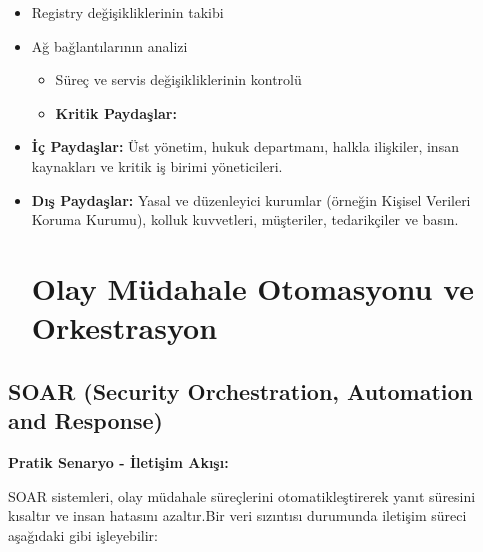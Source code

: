 \begin{itemize}
\begin{itemize}
        \item Registry değişikliklerinin takibi

        \item Ağ bağlantılarının analizi\begin{itemize}

        \item Süreç ve servis değişikliklerinin kontrolü    \item \textbf{Kritik Paydaşlar:}

    \end{itemize}    \begin{itemize}

\end{itemize}        \item \textbf{İç Paydaşlar:} Üst yönetim, hukuk departmanı, halkla ilişkiler, insan kaynakları ve kritik iş birimi yöneticileri.

        \item \textbf{Dış Paydaşlar:} Yasal ve düzenleyici kurumlar (örneğin Kişisel Verileri Koruma Kurumu), kolluk kuvvetleri, müşteriler, tedarikçiler ve basın.

\section{Olay Müdahale Otomasyonu ve Orkestrasyon}    \end{itemize}

\end{itemize}

\subsection{SOAR (Security Orchestration, Automation and Response)}\textbf{Pratik Senaryo - İletişim Akışı:}

SOAR sistemleri, olay müdahale süreçlerini otomatikleştirerek yanıt süresini kısaltır ve insan hatasını azaltır.Bir veri sızıntısı durumunda iletişim süreci aşağıdaki gibi işleyebilir:

